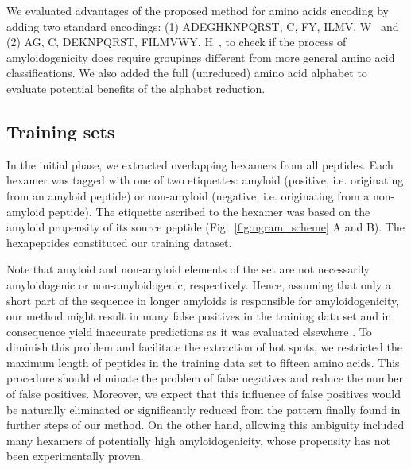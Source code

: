 \documentclass[fleqn,10pt,twoside]{gcb15submission}
\begin{document}
  We evaluated advantages of the proposed method for amino acids encoding by 
adding two standard encodings: (1) ADEGHKNPQRST, C, FY, ILMV, W~\citep{kosiol_new_2004} 
and (2) AG, C, DEKNPQRST, FILMVWY, H~\citep{melo_accuracy_2006}, to check if the process 
of amyloidogenicity does require groupings different from more general 
amino acid classifications. We also added the full (unreduced) amino acid 
alphabet to 
evaluate potential benefits of the alphabet reduction.

\subsection{Training sets}


In the initial phase, we extracted overlapping hexamers from all peptides. Each 
hexamer was tagged with one of two etiquettes: amyloid (positive, i.e. 
originating from an amyloid peptide) or non-amyloid (negative, i.e. originating 
from a non-amyloid peptide). The etiquette ascribed to the hexamer was based on 
the amyloid propensity of its source peptide (Fig.~\ref{fig:ngram_scheme} A and 
B). The hexapeptides constituted our training dataset. 

  Note that amyloid and non-amyloid elements of the set are not necessarily 
amyloidogenic or non-amyloidogenic, respectively. Hence, assuming that only a 
short part of the sequence in longer amyloids is responsible for 
amyloidogenicity, our method might result in many false positives in the 
training data set and in consequence yield inaccurate predictions as it was 
evaluated elsewhere \citep{kotulska_amyloid_2013}. To diminish this problem and 
facilitate the extraction of hot spots, we restricted the maximum length of 
peptides in the training data set to fifteen amino acids. This procedure should 
eliminate the problem of false negatives and reduce the number of false 
positives. Moreover, we expect that this  influence of false positives  would be 
naturally eliminated or significantly reduced from the pattern finally found in 
further steps of our method. On the other hand, allowing this ambiguity included 
many hexamers of potentially high amyloidogenicity, whose propensity has not 
been experimentally proven. 
%
%
%
%
%
\end{document}
